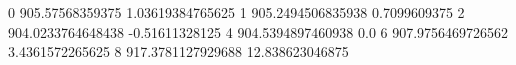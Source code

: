 0 905.57568359375 1.03619384765625
1 905.2494506835938 0.7099609375
2 904.0233764648438 -0.51611328125
4 904.5394897460938 0.0
6 907.9756469726562 3.4361572265625
8 917.3781127929688 12.838623046875
